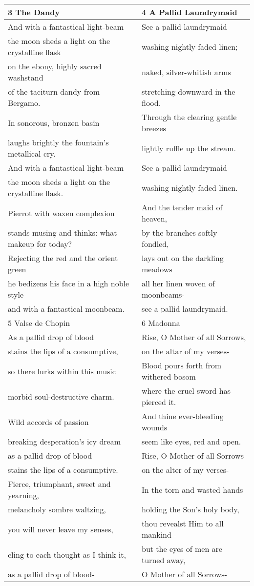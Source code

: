\begin{table}[h!]
\begin{tabular}{p{8.0cm}|p{8.0cm}}
3 The Dandy & 4 A Pallid Laundrymaid\\\hline
And with a fantastical light-beam & See a pallid laundrymaid \\
the moon sheds a light on the crystalline flask & washing nightly faded linen;\\
on the ebony, highly sacred washstand & naked, silver-whitish arms\\
of the taciturn dandy from Bergamo.& stretching downward in the flood.\\
In sonorous, bronzen basin& Through the clearing gentle breezes\\
laughs brightly the fountain's metallical cry.& lightly ruffle up the stream.\\
And with a fantastical light-beam & See a pallid laundrymaid\\
the moon sheds a light on the crystalline flask.& washing nightly faded linen.\\
Pierrot with waxen complexion & And the tender maid of heaven,\\
stands musing and thinks: what makeup for today?& by the branches softly fondled,\\
Rejecting the red and the orient green & lays out on the darkling meadows \\
he bedizens his face in a high noble style & all her linen woven of moonbeams- \\
and with a fantastical moonbeam. & see a pallid laundrymaid.\\\hline


5 Valse de Chopin & 6 Madonna\\\hline
As a pallid drop of blood& Rise, O Mother of all Sorrows,\\
stains the lips of a consumptive,& on the altar of my verses- \\
so there lurks within this music& Blood pours forth from withered bosom\\
morbid soul-destructive charm.& where the cruel sword has pierced it.\\
Wild accords of passion& And thine ever-bleeding wounds\\
breaking desperation's icy dream& seem like eyes, red and open.\\
as a pallid drop of blood& Rise, O Mother of all Sorrows\\
stains the lips of a consumptive.& on the alter of my verses-\\
Fierce, triumphant, sweet and yearning,& In the torn and wasted hands\\
melancholy sombre waltzing,& holding the Son's holy body,\\
you will never leave my senses,& thou revealst Him to all mankind -\\
cling to each thought as I think it,& but the eyes of men are turned away,\\
as a pallid drop of blood-& O Mother of all Sorrows-\\\hline  

\end{tabular}
\end{table}

